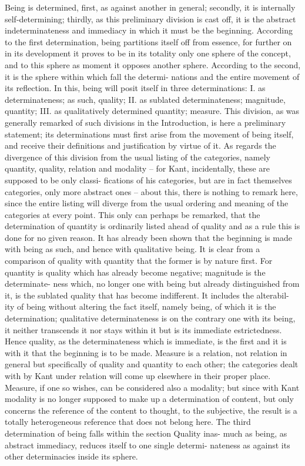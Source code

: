 \documentclass{article}
\begin{document}
Being is determined, first, as against another in general; secondly, it is
internally self-determining; thirdly, as this preliminary division is cast off,
it is the abstract indeterminateness and immediacy in which it must be the
beginning.
According to the first determination, being partitions itself off from
essence, for further on in its development it proves to be in its totality only
one sphere of the concept, and to this sphere as moment it opposes another
sphere.
According to the second, it is the sphere within which fall the determi-
nations and the entire movement of its reflection. In this, being will posit
itself in three determinations:
I. as determinateness; as such, quality;
II. as sublated determinateness; magnitude, quantity;
III. as qualitatively determined quantity; measure.
This division, as was generally remarked of such divisions in the
Introduction, is here a preliminary statement; its determinations must
first arise from the movement of being itself, and receive their definitions
and justification by virtue of it. As regards the divergence of this division
from the usual listing of the categories, namely quantity, quality, relation
and modality – for Kant, incidentally, these are supposed to be only classi-
fications of his categories, but are in fact themselves categories, only more
abstract ones – about this, there is nothing to remark here, since the entire
listing will diverge from the usual ordering and meaning of the categories
at every point.
This only can perhaps be remarked, that the determination of quantity
is ordinarily listed ahead of quality and as a rule this is done for no given
reason. It has already been shown that the beginning is made with being
as such, and hence with qualitative being. It is clear from a comparison
of quality with quantity that the former is by nature first. For quantity is
quality which has already become negative; magnitude is the determinate-
ness which, no longer one with being but already distinguished from it, is
the sublated quality that has become indifferent. It includes the alterabil-
ity of being without altering the fact itself, namely being, of which it is
the determination; qualitative determinateness is on the contrary one with
its being, it neither transcends it nor stays within it but is its immediate
estrictedness. Hence quality, as the determinateness which is immediate,
is the first and it is with it that the beginning is to be made.
Measure is a relation, not relation in general but specifically of quality
and quantity to each other; the categories dealt with by Kant under relation
will come up elsewhere in their proper place. Measure, if one so wishes,
can be considered also a modality; but since with Kant modality is no
longer supposed to make up a determination of content, but only concerns
the reference of the content to thought, to the subjective, the result is a
totally heterogeneous reference that does not belong here.
The third determination of being falls within the section Quality inas-
much as being, as abstract immediacy, reduces itself to one single determi-
nateness as against its other determinacies inside its sphere.
\end{document}
